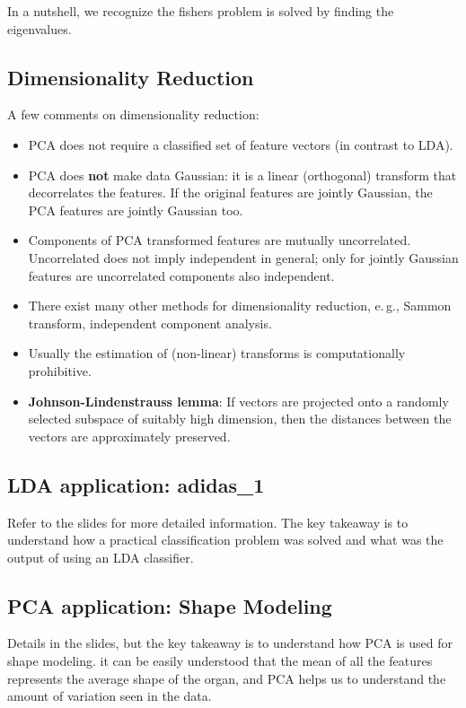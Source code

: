 In a nutshell, we recognize the fishers problem is solved by finding the eigenvalues. 

\subsection{Dimensionality Reduction}


	A few comments on dimensionality reduction:

	\begin{itemize}
		\item PCA does not require a classified set of feature vectors  (in contrast to LDA). 
		\item PCA does \textbf{not} make data Gaussian: it is a linear (orthogonal) transform that decorrelates the features. If the original features are jointly Gaussian, the PCA features are jointly Gaussian too.
		\item Components of PCA transformed features are mutually uncorrelated. Uncorrelated does not imply independent in general; only for jointly Gaussian features are uncorrelated components also independent. 
		\item There exist many other methods for dimensionality reduction, e.\,g.,  Sammon transform, independent component analysis. 
		\item Usually the estimation of (non-linear) transforms is computationally prohibitive.
		\item \textbf{Johnson-Lindenstrauss lemma}: If vectors are projected onto a randomly selected subspace of suitably high dimension, then the distances between the vectors are approximately preserved.
	\end{itemize}
	
\subsection{LDA application: adidas\_1 }
Refer to the slides for more detailed information. The key takeaway is to understand how a practical classification problem was solved and what was the output of using an LDA classifier. 

\subsection{PCA application: Shape Modeling}

Details in the slides, but the key takeaway is to understand how PCA is used for shape modeling. it can be easily understood that the mean of all the features represents the average shape of the organ, and PCA helps us to understand the amount of variation seen in the data. 

